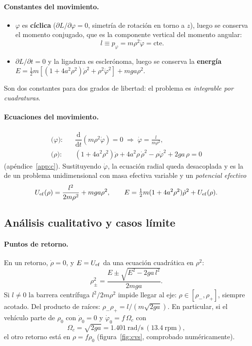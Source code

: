 \documentclass[11pt,a4paper]{article}
\newcommand{\dd}{\mathrm{d}}
\newcommand{\ddt}[1]{\dfrac{\dd #1}{\dd t}}
\begin{document}
\paragraph{Constantes del movimiento.}
\begin{itemize}[leftmargin=*]
 \item $\varphi$ es \textbf{cíclica} ($\partial L/\partial\varphi=0$, simetría de rotación en torno a $z$), luego se conserva el momento conjugado, que es la componente vertical del momento angular:
 \begin{equation}
  l\equiv p_\varphi=m\rho^2\dot\varphi=\text{cte}.
 \end{equation}
 \item $\partial L/\partial t=0$ y la ligadura es esclerónoma, luego se conserva la \textbf{energía}
 $E=\tfrac12m\left[(1+4a^2\rho^2)\dot\rho^2+\rho^2\dot\varphi^2\right]+mga\rho^2$.
\end{itemize}
Son dos constantes para dos grados de libertad: el problema es \emph{integrable por cuadraturas}.

\paragraph{Ecuaciones del movimiento.}
\begin{align}
 \text{($\varphi$):}\quad & \ddt{}\!\left(m\rho^2\dot\varphi\right)=0 \;\Longrightarrow\; \dot\varphi=\frac{l}{m\rho^2},\\[1mm]
 \text{($\rho$):}\quad & \boxed{\left(1+4a^2\rho^2\right)\ddot\rho+4a^2\rho\,\dot\rho^2-\rho\dot\varphi^2+2ga\,\rho=0}\label{eq:movc}
\end{align}
(apéndice~\ref{app:c}). Sustituyendo $\dot\varphi$, la ecuación radial queda desacoplada y es la de un problema unidimensional con masa efectiva
variable y un \emph{potencial efectivo}
\begin{equation}
 U_{\rm ef}(\rho)=\frac{l^2}{2m\rho^2}+mga\rho^2 ,\qquad E=\tfrac12m(1+4a^2\rho^2)\dot\rho^2+U_{\rm ef}(\rho).
\end{equation}

\subsection{Análisis cualitativo y casos límite}
\paragraph{Puntos de retorno.} En un retorno, $\dot\rho=0$, y $E=U_{\rm ef}$ da una ecuación cuadrática en $\rho^2$:
\begin{equation}\label{eq:retornos}
 \rho_\pm^2=\frac{E\pm\sqrt{E^2-2ga\,l^2}}{2mga}.
\end{equation}
Si $l\neq0$ la barrera centrífuga $l^2/2m\rho^2$ impide llegar al eje: $\rho\in[\rho_-,\rho_+]$, siempre acotado. Del producto de raíces:
$\rho_-\rho_+=l/(m\sqrt{2ga})$. En particular, si el vehículo parte de $\rho_0$ con $\dot\rho_0=0$ y $\dot\varphi_0=f\,\Omega_c$ con
\begin{equation}
 \Omega_c=\sqrt{2ga}=1.401\ \mathrm{rad/s}\ (13.4\ \mathrm{rpm}),
\end{equation}
el otro retorno está en $\rho=f\rho_0$ (figura~\ref{fig:cvs}, comprobado numéricamente).
\end{document}
